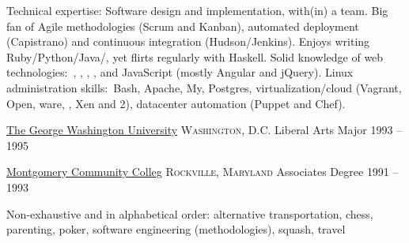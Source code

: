 \documentclass[10pt,a4paper]{article}
\begin{document}
\vspace{1em}

\spacedhrule{-0.2em}{-0.4em}


\inlineheadsection  %
  {Technical expertise:}
  {Software design and implementation, with(in) a team.  Big fan of Agile methodologies (Scrum and Kanban), automated deployment (Capistrano) and continuous integration (Hudson/Jenkins).  Enjoys writing Ruby/\nsp Python/\nsp Java/\nsp \CPP, yet flirts regularly with Haskell.  Solid knowledge of web technologies:\ , , , ,  and JavaScript (mostly Angular and jQuery).  Linux administration skills:\ Bash, Apache, My, Postgres, virtualization/cloud (Vagrant, Open, ware, , Xen and 2), datacenter automation (Puppet and Chef).}


\spacedhrule{2em}{-0.4em}


\headedsection
  {\href{http://www.eur.nl/english}{The George Washington University}}
  {\textsc{Washington, D.C.}} {%
  \headedsubsection
    {Liberal Arts Major}
    {1993 -- 1995}
    {}
}

\headedsection
  {\href{http://www.libanonlyceum.nl}{Montgomery Community Colleg}}
  {\textsc{Rockville, Maryland}} {%
  \headedsubsection
    {Associates Degree}
    {1991 -- 1993} {}
}

\vspace{0.5em}

\spacedhrule{1.6em}{-0.4em}


\inlineheadsection
  {Non-exhaustive and in alphabetical order:}
  {alternative transportation, chess, parenting, poker, software engineering (methodologies), squash, travel}
\end{document}

